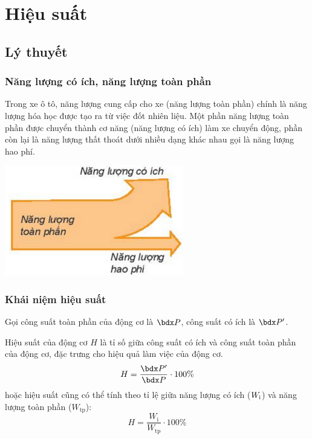 \let\lesson\undefined
\newcommand{\lesson}{\phantomlesson{Bài 16: Công suất. Hiệu suất.}}
\chapter[Hiệu suất]{Hiệu suất}
\setcounter{section}{0}
\section{Lý thuyết}
\subsection{Năng lượng có ích, năng lượng toàn phần}
\begin{minipage}{0.6\textwidth}
	Trong xe ô tô, năng lượng cung cấp cho xe (năng lượng toàn phần) chính là năng lượng hóa học được tạo ra từ việc đốt nhiên liệu. Một phần năng lượng toàn phần được chuyển thành cơ năng (năng lượng có ích) làm xe chuyển động, phần còn lại là năng lượng thất thoát dưới nhiều dạng khác nhau gọi là năng lượng hao phí.
\end{minipage}
\begin{minipage}{0.4\textwidth}
	\begin{center}
		\includegraphics[scale=0.8]{../figs/G10-022-1}
	\end{center}
\end{minipage}

\subsection{Khái niệm hiệu suất}
Gọi công suất toàn phần của động cơ là $\calP$, công suất có ích là $\calP'$.

Hiệu suất của động cơ $H$ là tỉ số giữa công suất có ích và công suất toàn phần của động cơ, đặc trưng cho hiệu quả làm việc của động cơ.
$$H=\dfrac{\calP'}{\calP} \cdot 100\%$$
hoặc hiệu suất cũng có thể tính theo tỉ lệ giữa năng lượng có ích ($W_\text i$) và năng lượng toàn phần ($W_\text{tp}$):
$$H=\dfrac{W_\text{i}}{W_\text{tp}} \cdot 100\%$$

